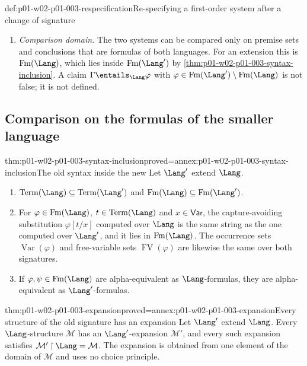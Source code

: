 \begin{hbmethod}{def:p01-w02-p01-003-respecification}{Re-specifying a first-order system after a change of signature}
\begin{enumerate}
        the inherited theorems applied to the signature \(\Lang'\)
        (\cref{thm:fol-soundness,thm:fol-completeness}), and the second
        carries its Axiom-of-Choice hypothesis.
  \item \emph{Comparison domain.} The two systems can be compared only on
        premise sets and conclusions that are formulas of both languages.
        For an extension this is \(\operatorname{Fm}(\Lang)\), which lies
        inside \(\operatorname{Fm}(\Lang')\) by
        \cref{thm:p01-w02-p01-003-syntax-inclusion}. A claim
        \(\Gamma\entails_{\Lang}\varphi\) with
        \(\varphi\in\operatorname{Fm}(\Lang')\setminus\operatorname{Fm}(\Lang)\)
        is not false; it is not defined.
\end{enumerate}
\end{hbmethod}

\subsection{Comparison on the formulas of the smaller language}
\label{sec:p01-w02-p01-003-comparison}

\begin{hblemma}{thm:p01-w02-p01-003-syntax-inclusion}{proved=annex:p01-w02-p01-003-syntax-inclusion}{The old syntax inside the new}
Let \(\Lang'\) extend \(\Lang\).
\begin{enumerate}
  \item \(\operatorname{Term}(\Lang)\subseteq\operatorname{Term}(\Lang')\)
        and \(\operatorname{Fm}(\Lang)\subseteq\operatorname{Fm}(\Lang')\).
  \item For \(\varphi\in\operatorname{Fm}(\Lang)\),
        \(t\in\operatorname{Term}(\Lang)\) and \(x\in\mathsf{Var}\), the
        capture-avoiding substitution \(\varphi[t/x]\) computed over
        \(\Lang\) is the same string as the one computed over \(\Lang'\), and
        it lies in \(\operatorname{Fm}(\Lang)\). The occurrence sets
        \(\operatorname{Var}(\varphi)\) and free-variable sets
        \(\operatorname{FV}(\varphi)\) are likewise the same over both
        signatures.
  \item If \(\varphi,\psi\in\operatorname{Fm}(\Lang)\) are
        alpha-equivalent as \(\Lang\)-formulas, they are alpha-equivalent as
        \(\Lang'\)-formulas.
\end{enumerate}
\end{hblemma}

\begin{hblemma}{thm:p01-w02-p01-003-expansion}{proved=annex:p01-w02-p01-003-expansion}{Every structure of the old signature has an expansion}
Let \(\Lang'\) extend \(\Lang\). Every \(\Lang\)-structure \(\mathcal M\)
has an \(\Lang'\)-expansion \(\mathcal M'\), and every such expansion
satisfies \(\mathcal M'\mathbin{\upharpoonright}\Lang=\mathcal M\). The
expansion is obtained from one element of the domain of \(\mathcal M\) and
uses no choice principle.
\end{hblemma}

